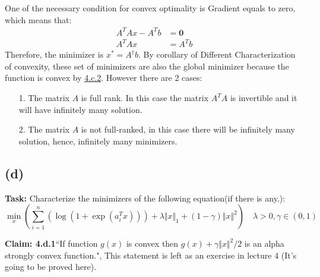 \documentclass[]{article}
\begin{document}
    One of the necessary condition for convex optimality is Gradient equals to zero, which means that: 
    \begin{align*}\tag{4.c.7}\label{eqn:4.c.7}
         A^TAx - A^Tb &= \mathbf{0} \\ 
         A^TAx &= A^Tb
    \end{align*}
    Therefore, the minimizer is $x^* = A^\dagger b$. By corollary of Different Characterization of convexity, these set of minimizers are also the global minimizer because the function is convex by \hyperref[4c2]{4.c.2}. 
    However there are 2 cases: 
    \begin{enumerate}
        \item[1.] The matrix $A$ is full rank. In this case the matrix $A^TA$ is invertible and it will have infinitely many solution. 
        \item[2.] The matrix $A$ is not full-ranked, in this case there will be infinitely many solution, hence, infinitely many minimizers. 
    \end{enumerate} 
\subsection*{(d)}
    \textbf{Task: } Characterize the minimizers of the following equation(if there is any.): 
    \begin{equation}\tag{4.d.0}\label{eqn:4.d.0}
        \min_x
        \left(
         \sum_{i = 1}^{n} \left(
            \log(1 + \exp(a_i^Tx))
          \right)
          + \lambda \Vert x\Vert_1 + (1 - \gamma)\Vert x\Vert^2 
        \right)\quad \lambda > 0, \gamma \in (0, 1)
    \end{equation}
    \par
    \textbf{Claim: 4.d.1}``If function $g(x)$ is convex then $g(x) + \gamma \Vert x\Vert^2/2$ is an alpha strongly convex function.", This statement is left as an exercise in lecture 4 (It's going to be proved here). 
    
\end{document}
